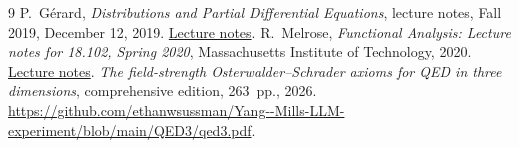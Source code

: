 \documentclass[11pt,letterpaper,reqno]{amsart}
\theoremstyle{definition}
\theoremstyle{remark}
\begin{document}
\begin{thebibliography}{9}
 P.~G\'erard, \emph{Distributions and Partial Differential
Equations}, lecture notes, Fall 2019, December 12, 2019.
\href{https://www.imo.universite-paris-saclay.fr/~patrick.gerard/Distributions2019_Chap1,2,3.pdf}{Lecture notes}.
 R.~Melrose, \emph{Functional Analysis: Lecture notes
for 18.102, Spring 2020}, Massachusetts Institute of Technology, 2020.
\href{https://ocw.mit.edu/courses/18-102-introduction-to-functional-analysis-spring-2021/3d4cc88026d44a01f936cd6a0aa995cb_MIT18_102s20_lec_FA.pdf}{Lecture notes}.
\emph{The field-strength Osterwalder--Schrader axioms for QED
in three dimensions}, comprehensive edition, 263~pp., 2026.
\url{https://github.com/ethanwsussman/Yang--Mills-LLM-experiment/blob/main/QED3/qed3.pdf}.
\end{thebibliography}
\end{document}
